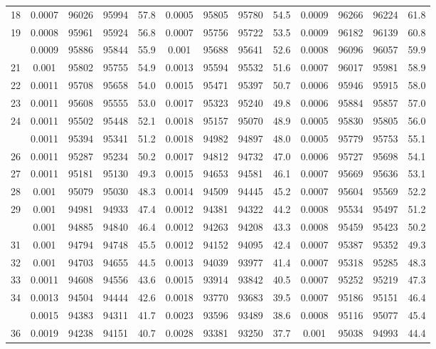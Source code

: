 \documentclass[
  14pt,
]{article}
\begin{document}
\begin{longtable}[t]{lcccccccccccc}
18 & 0.0007 & 96026 & 95994 & 57.8 & 0.0005 & 95805 & 95780 & 54.5 & 0.0009 & 96266 & 96224 & 61.8\\
19 & 0.0008 & 95961 & 95924 & 56.8 & 0.0007 & 95756 & 95722 & 53.5 & 0.0009 & 96182 & 96139 & 60.8\\
\addlinespace
20 & 0.0009 & 95886 & 95844 & 55.9 & 0.001 & 95688 & 95641 & 52.6 & 0.0008 & 96096 & 96057 & 59.9\\
21 & 0.001 & 95802 & 95755 & 54.9 & 0.0013 & 95594 & 95532 & 51.6 & 0.0007 & 96017 & 95981 & 58.9\\
22 & 0.0011 & 95708 & 95658 & 54.0 & 0.0015 & 95471 & 95397 & 50.7 & 0.0006 & 95946 & 95915 & 58.0\\
23 & 0.0011 & 95608 & 95555 & 53.0 & 0.0017 & 95323 & 95240 & 49.8 & 0.0006 & 95884 & 95857 & 57.0\\
24 & 0.0011 & 95502 & 95448 & 52.1 & 0.0018 & 95157 & 95070 & 48.9 & 0.0005 & 95830 & 95805 & 56.0\\
\addlinespace
25 & 0.0011 & 95394 & 95341 & 51.2 & 0.0018 & 94982 & 94897 & 48.0 & 0.0005 & 95779 & 95753 & 55.1\\
26 & 0.0011 & 95287 & 95234 & 50.2 & 0.0017 & 94812 & 94732 & 47.0 & 0.0006 & 95727 & 95698 & 54.1\\
27 & 0.0011 & 95181 & 95130 & 49.3 & 0.0015 & 94653 & 94581 & 46.1 & 0.0007 & 95669 & 95636 & 53.1\\
28 & 0.001 & 95079 & 95030 & 48.3 & 0.0014 & 94509 & 94445 & 45.2 & 0.0007 & 95604 & 95569 & 52.2\\
29 & 0.001 & 94981 & 94933 & 47.4 & 0.0012 & 94381 & 94322 & 44.2 & 0.0008 & 95534 & 95497 & 51.2\\
\addlinespace
30 & 0.001 & 94885 & 94840 & 46.4 & 0.0012 & 94263 & 94208 & 43.3 & 0.0008 & 95459 & 95423 & 50.2\\
31 & 0.001 & 94794 & 94748 & 45.5 & 0.0012 & 94152 & 94095 & 42.4 & 0.0007 & 95387 & 95352 & 49.3\\
32 & 0.001 & 94703 & 94655 & 44.5 & 0.0013 & 94039 & 93977 & 41.4 & 0.0007 & 95318 & 95285 & 48.3\\
33 & 0.0011 & 94608 & 94556 & 43.6 & 0.0015 & 93914 & 93842 & 40.5 & 0.0007 & 95252 & 95219 & 47.3\\
34 & 0.0013 & 94504 & 94444 & 42.6 & 0.0018 & 93770 & 93683 & 39.5 & 0.0007 & 95186 & 95151 & 46.4\\
\addlinespace
35 & 0.0015 & 94383 & 94311 & 41.7 & 0.0023 & 93596 & 93489 & 38.6 & 0.0008 & 95116 & 95077 & 45.4\\
36 & 0.0019 & 94238 & 94151 & 40.7 & 0.0028 & 93381 & 93250 & 37.7 & 0.001 & 95038 & 94993 & 44.4\\

\end{longtable}
\end{document}

